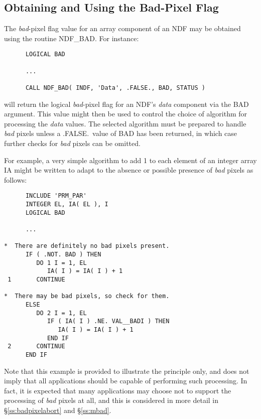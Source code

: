 \documentclass[twoside,11pt]{article}
\newcommand{\htmlref}[2]{#1}
\newcommand{\xlabel}[1]{}
\newcommand{\st}[1]{{\em{#1}}}
\begin{document}
\subsection{\xlabel{obtaining_and_using_the_bad-pixel_flag}\label{ss:usingbadpixflag}Obtaining and Using the Bad-Pixel Flag}

The \st{bad\/}-pixel flag value for an array component of an NDF may be
obtained using the routine \htmlref{NDF\_BAD}{NDF_BAD}. 
For instance:

\small
\begin{verbatim}
      LOGICAL BAD

      ...

      CALL NDF_BAD( INDF, 'Data', .FALSE., BAD, STATUS )
\end{verbatim}
\normalsize

will return the logical \st{bad\/}-pixel flag for an NDF's \st{data\/} component
via the BAD argument.
This value might then be used to control the choice of algorithm for
processing the \st{data\/} values. 
The selected algorithm must be prepared to handle \st{bad\/} pixels unless a
.FALSE.\ value of BAD has been returned, in which case further checks
for \st{bad\/} pixels can be omitted.  

For example, a very simple algorithm to add 1 to each element of an integer
array IA might be written to adapt to the absence or possible presence of
\st{bad\/} pixels as follows: 

\small
\begin{verbatim}
      INCLUDE 'PRM_PAR'
      INTEGER EL, IA( EL ), I
      LOGICAL BAD

      ...

*  There are definitely no bad pixels present.
      IF ( .NOT. BAD ) THEN
         DO 1 I = 1, EL
            IA( I ) = IA( I ) + 1
 1       CONTINUE

*  There may be bad pixels, so check for them.
      ELSE
         DO 2 I = 1, EL
            IF ( IA( I ) .NE. VAL__BADI ) THEN
               IA( I ) = IA( I ) + 1
            END IF
 2       CONTINUE
      END IF
\end{verbatim}
\normalsize

Note that this example is provided to illustrate the principle only, and
does not imply that all applications should be capable of performing such 
processing.
In fact, it is expected that many applications may choose not to support the
processing of \st{bad\/} pixels at all, and this is considered in more detail
in \S\ref{ss:badpixelabort} and \S\ref{ss:mbad}. 
\end{document}

